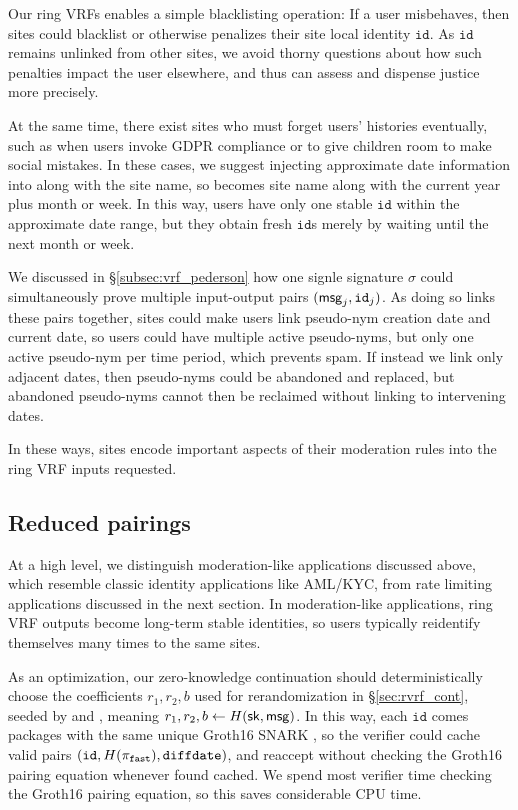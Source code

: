 Our ring VRFs enables a simple blacklisting operation:
If a user misbehaves, then sites could blacklist or otherwise penalizes
their site local identity $\mathtt{id}$.
As $\mathtt{id}$ remains unlinked from other sites, we avoid thorny
questions about how such penalties impact the user elsewhere, and thus
can assess and dispense justice more precisely. 

At the same time, there exist sites who must forget users' histories
eventually, such as when users invoke GDPR compliance or to give children
room to make social mistakes.  In these cases, we suggest injecting
approximate date information into \msg along with the site name,
so \msg becomes site name along with the current year plus month or week.
In this way, users have only one stable $\mathtt{id}$ within the
approximate date range, but they obtain fresh $\mathtt{id}$s merely
by waiting until the next month or week.

We discussed in \S\ref{subsec:vrf_pederson} how one signle \PedVRF
signature $\sigma$ could simultaneously prove multiple input-output
pairs $(\mathsf{msg}_j,\mathtt{id}_j)$.  As doing so links these pairs
together, sites could make users link pseudo-nym creation date and
current date, so users could have multiple active pseudo-nyms,
but only one active pseudo-nym per time period, which prevents spam.
If instead we link only adjacent dates, then pseudo-nyms could
be abandoned and replaced, but abandoned pseudo-nyms cannot then
be reclaimed without linking to intervening dates.

In these ways, sites encode important aspects of their moderation rules
into the ring VRF inputs requested.  


\subsection{Reduced pairings}
\label{sec:reduced_pairings}

At a high level, we distinguish moderation-like applications discussed
above, which resemble classic identity applications like AML/KYC, from
rate limiting applications discussed in the next section. 
%
In moderation-like applications, ring VRF outputs become long-term
stable identities, so users typically reidentify themselves many times
to the same sites.

As an optimization, our zero-knowledge continuation
should deterministically choose the coefficients $r_1,r_2,b$ used for
rerandomization in \S\ref{sec:rvrf_cont},
 seeded by \msg and \sk, meaning $r_1,r_2,b \leftarrow H(\mathsf{sk},\mathsf{msg})$. 
%
In this way, each $\mathtt{id}$ comes packages with the same unique
Groth16 SNARK \pifast, so the verifier could cache valid pairs
$(\mathtt{id},H(\pi_{\mathtt{fast}}),\mathtt{diffdate})$, and reaccept \pifast
without checking the Groth16 pairing equation whenever found cached.
%
We spend most verifier time checking the Groth16 pairing equation, so
this saves considerable CPU time. %

